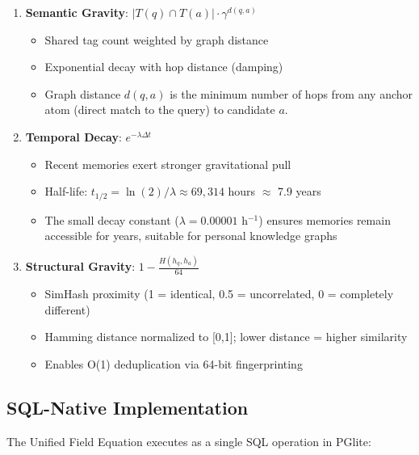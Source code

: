 \documentclass[11pt]{article}
\begin{document}
\begin{enumerate}
    \item \textbf{Semantic Gravity}: $|T(q) \cap T(a)| \cdot \gamma^{d(q,a)}$
    \begin{itemize}
        \item Shared tag count weighted by graph distance
        \item Exponential decay with hop distance (damping)
        \item Graph distance $d(q,a)$ is the minimum number of hops from any anchor atom (direct match to the query) to candidate $a$.
    \end{itemize}

    \item \textbf{Temporal Decay}: $e^{-\lambda \Delta t}$
    \begin{itemize}
        \item Recent memories exert stronger gravitational pull
        \item Half-life: $t_{1/2} = \ln(2)/\lambda \approx 69,314$ hours $\approx$ 7.9 years
        \item The small decay constant ($\lambda = 0.00001$ h$^{-1}$) ensures memories remain accessible for years, suitable for personal knowledge graphs
    \end{itemize}

    \item \textbf{Structural Gravity}: $1 - \frac{H(h_q, h_a)}{64}$
    \begin{itemize}
        \item SimHash proximity (1 = identical, 0.5 = uncorrelated, 0 = completely different)
        \item Hamming distance normalized to [0,1]; lower distance = higher similarity
        \item Enables O(1) deduplication via 64-bit fingerprinting \cite{charikar2002similar}
    \end{itemize}
\end{enumerate}

\subsection{SQL-Native Implementation}

The Unified Field Equation executes as a single SQL operation in PGlite:
\end{document}
